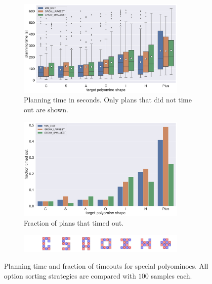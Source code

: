 \begin{figure}
	\centering
	\begin{subfigure}[b]{\textwidth}
		\centering
		\includegraphics[width=0.9\textwidth]{figures/plots/AFTS_sp_time.pdf}
		\caption{Planning time in seconds. Only plans that did not time out are shown.}
		\label{fig:AFTS_sp_time}
	\end{subfigure}
	\begin{subfigure}[b]{\textwidth}
		\centering
		\includegraphics[width=0.9\textwidth]{figures/plots/AFTS_sp_timeout.pdf}
		\caption{Fraction of plans that timed out.}
		\label{fig:AFTS_sp_timeout}
	\end{subfigure}
	\begin{subfigure}[b]{\textwidth}
		\centering
		\includegraphics[width=0.9\textwidth]{figures/AFTS_sp_shapes_small.pdf}
	\end{subfigure}
	\caption[Planning time and fraction of timeouts for special polyominoes]{Planning time and fraction of timeouts for special polyominoes. All option sorting strategies are compared with $100$ samples each.}
	\label{fig:AFTS_sp_timestats}
\end{figure}


